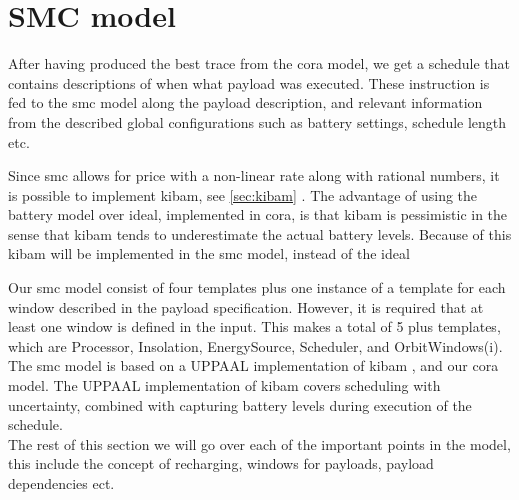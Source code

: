 \section{SMC model} \label{sec:smc_model}
After having produced the best trace from the \gls{cora} model, we get a schedule that contains descriptions of when what payload was executed. These instruction is fed to the \gls{smc} model along the payload description, and relevant information from the described global configurations such as battery settings, schedule length etc.

Since \gls{smc} allows for price with a non-linear rate along with rational numbers, it is possible to implement \gls{kibam}, see \ref{sec:kibam} . The advantage of using the battery model over ideal, implemented in \gls{cora}, is that \gls{kibam} is pessimistic in the sense that \gls{kibam} tends to underestimate the actual battery levels. Because of this \gls{kibam} will be implemented in the \gls{smc} model, instead of the ideal

Our \gls{smc} model consist of four templates plus one instance of a template for each window described in the payload specification. However, it is required that at least one window is defined in the input. This makes a total of 5 plus templates, which are Processor, Insolation, EnergySource, Scheduler, and OrbitWindows(i).\\ 
The \gls{smc} model is based on a UPPAAL implementation of \gls{kibam} \cite{battery_aware_scheduling}, and our \gls{cora} model. The UPPAAL implementation of \gls{kibam} covers scheduling with uncertainty, combined with capturing battery levels during execution of the schedule. \\
The rest of this section we will go over each of the important points in the model, this include the concept of recharging, windows for payloads, payload dependencies ect. 

